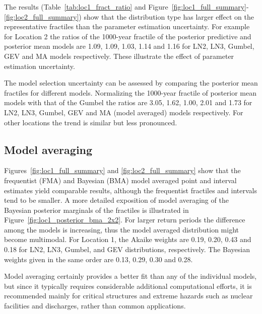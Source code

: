 The results (Table~\ref{tab:loc1_fract_ratio} and Figure~\ref{fig:loc1_full_summary}-\ref{fig:loc2_full_summary}) show that the distribution type has larger effect on the representative fractiles than the parameter estimation uncertainty. For example for Location 2 the ratios of the 1000-year fractile of the posterior predictive and posterior mean models are 1.09, 1.09, 1.03, 1.14 and 1.16 for LN2, LN3, Gumbel, GEV and MA models respectively. These illustrate the effect of parameter estimation uncertainty.

The model selection uncertainty can be assessed by comparing the posterior mean fractiles for different models. Normalizing the 1000-year fractile of posterior mean models with that of the Gumbel the ratios are 3.05, 1.62, 1.00, 2.01 and 1.73 for LN2, LN3, Gumbel, GEV and MA (model averaged) models respectively. For other locations the trend is similar but less pronounced.

\subsection{Model averaging}
Figures~\ref{fig:loc1_full_summary} and \ref{fig:loc2_full_summary} show that the frequentist (FMA) and Bayesian (BMA) model averaged point and interval estimates yield comparable results, although the frequentist fractiles and intervals tend to be smaller. A more detailed exposition of model averaging of the Bayesian posterior marginals of the fractiles is illustrated in Figure~\ref{fig:loc1_posterior_bma_2x2}. For larger return periods the difference among the models is increasing, thus the model averaged distribution might become multimodal. For Location 1, the Akaike weights are 0.19, 0.20, 0.43 and 0.18 for LN2, LN3, Gumbel, and GEV distributions, respectively. The Bayesian weights given in the same order are 0.13, 0.29, 0.30 and 0.28.

Model averaging certainly provides a better fit than any of the individual models, but since it typically requires considerable additional computational efforts, it is recommended mainly for critical structures and extreme hazards such as nuclear facilities and discharges, rather than common applications.

